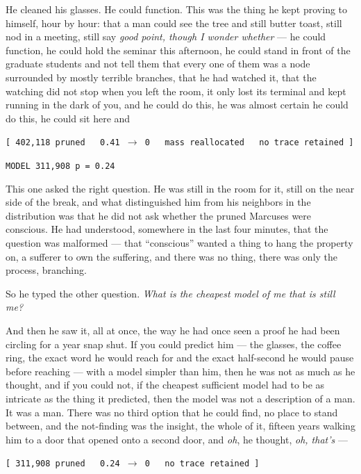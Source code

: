 He cleaned his glasses. He could function. This was the thing he kept proving to himself, hour by hour: that a man could see the tree and still butter toast, still nod in a meeting, still say \emph{good point, though I wonder whether} --- he could function, he could hold the seminar this afternoon, he could stand in front of the graduate students and not tell them that every one of them was a node surrounded by mostly terrible branches, that he had watched it, that the watching did not stop when you left the room, it only lost its terminal and kept running in the dark of you, and he could do this, he was almost certain he could do this, he could sit here and

\begin{center}
\texttt{[ 402,118 pruned \ \ 0.41 $\rightarrow$ 0 \ \ mass reallocated \ \ no trace retained ]}
\end{center}

\begin{center}
\texttt{MODEL 311,908 \quad p = 0.24}
\end{center}

This one asked the right question. He was still in the room for it, still on the near side of the break, and what distinguished him from his neighbors in the distribution was that he did not ask whether the pruned Marcuses were conscious. He had understood, somewhere in the last four minutes, that the question was malformed --- that ``conscious'' wanted a thing to hang the property on, a sufferer to own the suffering, and there was no thing, there was only the process, branching.

So he typed the other question. \emph{What is the cheapest model of me that is still me?}

And then he saw it, all at once, the way he had once seen a proof he had been circling for a year snap shut. If you could predict him --- the glasses, the coffee ring, the exact word he would reach for and the exact half-second he would pause before reaching --- with a model simpler than him, then he was not as much as he thought, and if you could not, if the cheapest sufficient model had to be as intricate as the thing it predicted, then the model was not a description of a man. It was a man. There was no third option that he could find, no place to stand between, and the not-finding was the insight, the whole of it, fifteen years walking him to a door that opened onto a second door, and \emph{oh}, he thought, \emph{oh, that's} ---

\begin{center}
\texttt{[ 311,908 pruned \ \ 0.24 $\rightarrow$ 0 \ \ no trace retained ]}
\end{center}

